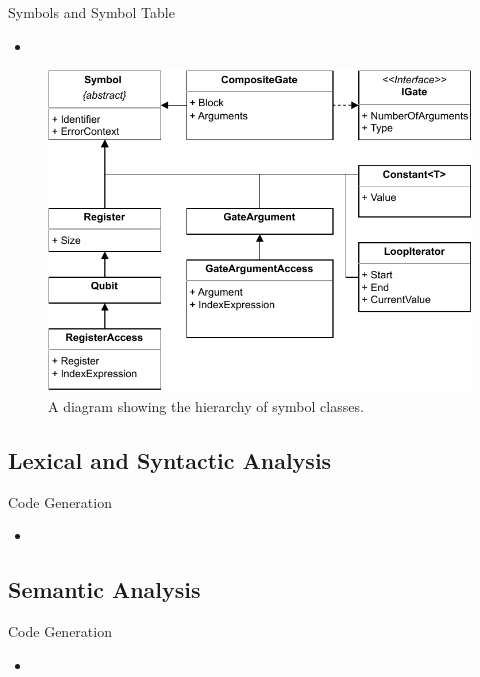 \begin{frame}{Symbols and Symbol Table}
    \begin{minipage}{.45\textwidth}
        \begin{itemize}
            \item 
        \end{itemize}    
    \end{minipage}
    \begin{minipage}{.45\textwidth}
        \centering
        \begin{figure}[htp]
            \centering
            \includegraphics[width=.95\textwidth]{../figures/drawio/slides/uml_symbols.pdf}
            \caption{A diagram showing the hierarchy of symbol classes.}
        \end{figure}
    \end{minipage}
\end{frame}

\subsection{Lexical and Syntactic Analysis}
\begin{frame}{Code Generation}
    \begin{itemize}
        \item 
    \end{itemize}
\end{frame}

\subsection{Semantic Analysis}
\begin{frame}{Code Generation}
    \begin{itemize}
        \item 
    \end{itemize}
\end{frame}

